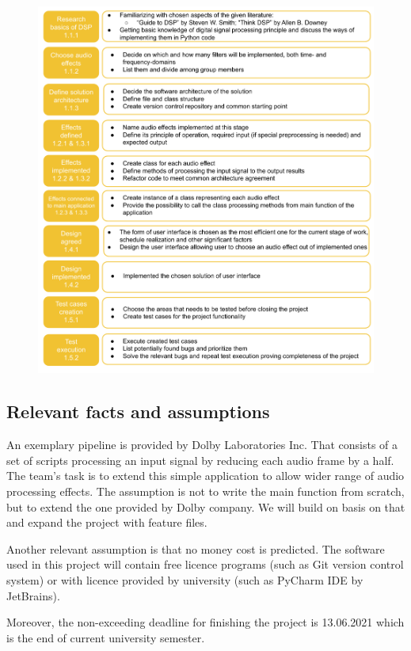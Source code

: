 \documentclass[12pt]{article}
\begin{document}
\begin{figure}[H]
		\includegraphics[width=1.2\textwidth, center]{WBS dictionary}
\end{figure}

\subsection{Relevant facts and assumptions}

An exemplary pipeline is provided by Dolby Laboratories Inc. That consists of a set of scripts processing an input signal by reducing each audio frame by a half. The team's task is to extend this simple application to allow wider range of audio processing effects. The assumption is not to write the main function from scratch, but to extend the one provided by Dolby company. We will build on basis on that and expand the project with feature files.

	Another relevant assumption is that no money cost is predicted. The software used in this project will contain free licence programs (such as Git version control system) or with licence provided by university (such as PyCharm IDE by JetBrains).
	
	Moreover, the non-exceeding deadline for finishing the project is 13.06.2021 which is the end of current university semester.
\end{document}
